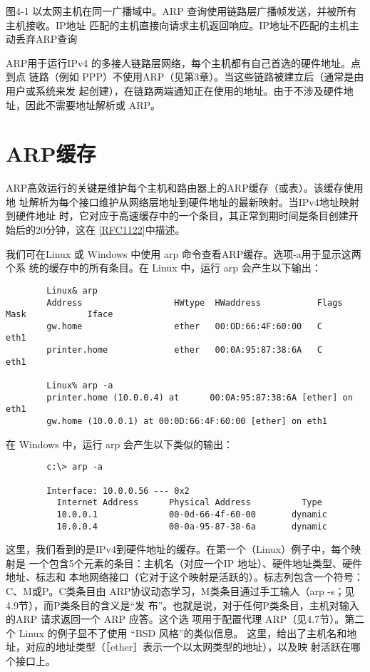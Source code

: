 图4-1 以太网主机在同一广播域中。ARP 查询使用链路层广播帧发送，并被所有主机接收。IP地址
匹配的主机直接向请求主机返回响应。IP地址不匹配的主机主动丢弃ARP查询

ARP用于运行IPv4 的多接人链路层网络，每个主机都有自己首选的硬件地址。点到点
链路（例如 PPP）不使用ARP（见第3章）。当这些链路被建立后（通常是由用户或系统来发
起创建），在链路两端通知正在使用的地址。由于不涉及硬件地址，因此不需要地址解析或
ARP。

\section{ARP缓存}

ARP高效运行的关键是维护每个主机和路由器上的ARP缓存（或表）。该缓存使用地
址解析为每个接口维护从网络层地址到硬件地址的最新映射。当IPv4地址映射到硬件地址
时，它对应于高速缓存中的一个条目，其正常到期时间是条目创建开始后的20分钟，这在
\href{https://www.rfc-editor.org/rfc/rfc1122}{[RFC1122]}中描述。

我们可在Linux 或 Windows 中使用 arp 命令查看ARP缓存。选项-a用于显示这两个系
统的缓存中的所有条目。在 Linux 中，运行 arp 会产生以下输出：

\begin{verbatim}
        Linux& arp
        Address                  HWtype  HWaddress           Flags Mask            Iface
        gw.home                  ether   00:OD:66:4F:60:00   C                     eth1
        printer.home             ether   00:0A:95:87:38:6A   C                     eth1

        Linux% arp -a
        printer.home (10.0.0.4) at      00:0A:95:87:38:6A [ether] on eth1
        gw.home (10.0.0.1) at 00:0D:66:4F:60:00 [ether] on eth1
\end{verbatim}

在 Windows 中，运行 arp 会产生以下类似的输出：

\begin{verbatim}
        c:\> arp -a

        Interface: 10.0.0.56 --- 0x2
          Internet Address      Physical Address          Type
          10.0.0.1              00-0d-66-4f-60-00       dynamic
          10.0.0.4              00-0a-95-87-38-6a       dynamic
\end{verbatim}

这里，我们看到的是IPv4到硬件地址的缓存。在第一个（Linux）例子中，每个映射是
一个包含5个元素的条目：主机名（对应一个IP 地址）、硬件地址类型、硬件地址、标志和
本地网络接口（它对于这个映射是活跃的）。标志列包含一个符号：C、M或P。C类条目由
ARP协议动态学习，M类条目通过手工输人（arp -s；见4.9节），而P类条目的含义是“发
布”。也就是说，对于任何P类条目，主机对输入的ARP 请求返回一个 ARP 应答。这个选
项用于配置代理 ARP（见4.7节）。第二个 Linux 的例子显不了使用 “BSD 风格”的类似信息。
这里，给出了主机名和地址，对应的地址类型（［ether］表示一个以太网类型的地址），以及映
射活跃在哪个接口上。

